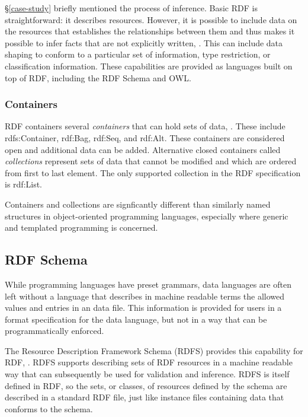 \S \ref{case-study} briefly mentioned the process of inference. Basic RDF is
straightforward: it describes resources. However, it is possible to include data
on the resources that establishes the relationships between them and thus makes
it possible to infer facts that are not explicitly written,
\cite{allemang_semantic_2008}. This can include data shaping to conform to a
particular set of information, type restriction, or classification information.
These capabilities are provided as languages built on top of RDF, including the
RDF Schema and OWL.


\subsubsection{Containers}

RDF containers several \textit{containers} that can hold sets of data,
\cite{rdf-syntax}. These include rdfs:Container, rdf:Bag, rdf:Seq, and rdf:Alt.
These containers are considered open and additional data can be added.
Alternative closed containers called \textit{collections} represent sets of data
that cannot be modified and which are ordered from first to last element. The
only supported collection in the RDF specification is rdf:List.

Containers and collections are signficantly different than similarly named
structures in object-oriented programming languages, especially where generic
and templated programming is concerned.

\subsection{RDF Schema}

While programming languages have preset grammars, data languages are often
left without a language that describes in machine readable terms the allowed
values and entries in an data file. This information is provided for users in
a format specification for the data language, but not in a way that can be
programmatically enforced. 

The Resource Description Framework Schema (RDFS) provides this capability for
RDF, \cite{rdf-schema, allemang_semantic_2008}. RDFS supports describing sets
of RDF resources in a machine readable way that can subsequently be used for
validation and inference. RDFS is itself defined in RDF, so the sets, or
classes, of resources defined by the schema are described in a standard RDF
file, just like instance files containing data that conforms to the schema.

